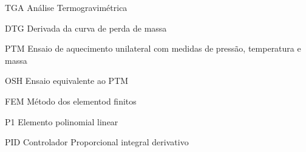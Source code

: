 \documentclass[
	12pt,				%
	openrany,			%
	oneside,			%
	a4paper,			%
	chapter=TITLE,		%
	english,			%
	french,				%
	spanish,			%
	brazil,				%
	hyphens,
  oldfontcommands]{abntex2}
\theoremstyle{definition}
\theoremstyle{definition}
\begin{document}
 

\listoffigures*
\cleardoublepage

\listoftables*
\cleardoublepage

\begin{siglas}
  \item[TGA] Análise Termogravimétrica
  \item[DTG] Derivada da curva de perda de massa
  \item[PTM] Ensaio de aquecimento unilateral com medidas de pressão,
    temperatura e massa
  \item[OSH] Ensaio equivalente ao PTM
  \item[FEM] Método dos elementod finitos
  \item[P1]  Elemento polinomial linear
  \item[PID] Controlador Proporcional integral derivativo
\end{siglas}
\end{document}
